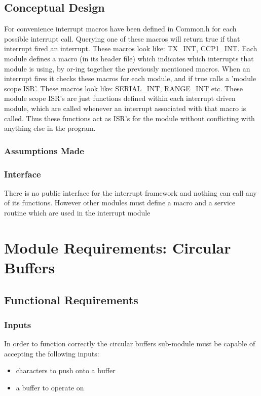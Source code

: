 \documentclass[]{report}
\begin{document}
\subsection{Conceptual Design}
For convenience interrupt macros have been defined in Common.h for each possible interrupt call. Querying one of these macros will return true if that interrupt fired an interrupt. These macros look like: TX\_INT, CCP1\_INT.\newline
Each module defines a macro (in its header file) which indicates which interrupts that module is using, by or-ing together the previously mentioned macros. When an interrupt fires it checks these macros for each module, and if true calls a 'module scope ISR'. These macros look like: SERIAL\_INT, RANGE\_INT etc. \newline
These module scope ISR's are just functions defined within each interrupt driven module, which are called whenever an interrupt associated with that macro is called. Thus these functions act as ISR's for the module without conflicting with anything else in the program.

\subsubsection{Assumptions Made}


\subsubsection{Interface}
There is no public interface for the interrupt framework and nothing can call any of its functions. However other modules must define a macro and a service routine which are used in the interrupt module

\section{Module Requirements: Circular Buffers}
\subsection{Functional Requirements}
\subsubsection{Inputs}
In order to function correctly the circular buffers sub-module must be capable of accepting the following inputs:
\begin{itemize}
	\item characters to push onto a buffer
	\item a buffer to operate on
\end{itemize}
\end{document}
